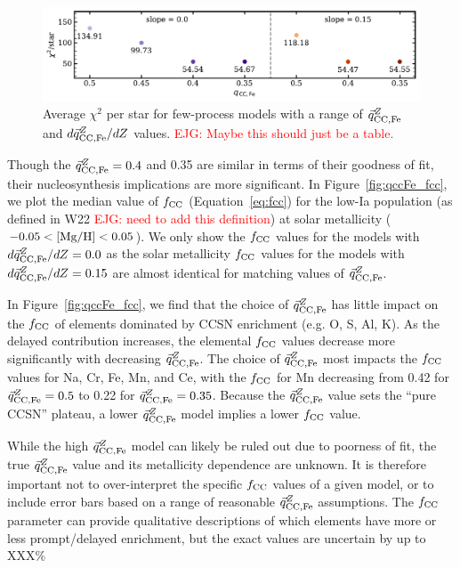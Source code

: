 \documentclass[modern]{aastex631}
\newcommand{\mgh}{[{\rm Mg}/{\rm H}]}
\newcommand{\qccFe}{\vec{q}_{{\rm CC, Fe}}^{Z}}
\newcommand{\dqccFe}{d\vec{q}_{{\rm CC, Fe}}^{Z}/dZ}
\newcommand{\fcc}{f_{\rm CC}}
\newcommand{\ejg}[1]{\textcolor{red}{EJG: #1}}
\begin{document}
\begin{figure}[htb!]
    \centering
    \includegraphics[width=\textwidth]{Paper/Figures/qccFe_chi2.pdf}
    \caption{Average $\chi^2$ per star for few-process models with a range of $\qccFe$ and $\dqccFe$ values. \ejg{Maybe this should just be a table.}}
    \label{fig:qccFe_chi2}
\end{figure}

Though the $\qccFe= 0.4$ and 0.35 are similar in terms of their goodness of fit, their nucleosynthesis implications are more significant. In Figure~\ref{fig:qccFe_fcc}, we plot the median value of $\fcc$ (Equation~\ref{eq:fcc}) for the low-Ia population (as defined in W22 \ejg{need to add this definition}) at solar metallicity ($-0.05 < \mgh < 0.05$). We only show the $\fcc$ values for the models with $\dqccFe=0.0$ as the solar metallicity $\fcc$ values for the models with $\dqccFe=0.15$ are almost identical for matching values of $\qccFe$.

In Figure~\ref{fig:qccFe_fcc}, we find that the choice of $\qccFe$ has little impact on the $\fcc$ of elements dominated by CCSN enrichment (e.g. O, S, Al, K). As the delayed contribution increases, the elemental $\fcc$ values decrease more significantly with decreasing $\qccFe$. The choice of $\qccFe$ most impacts the $\fcc$ values for Na, Cr, Fe, Mn, and Ce, with the $\fcc$ for Mn decreasing from 0.42 for $\qccFe=0.5$ to 0.22 for $\qccFe=0.35$. Because the $\qccFe$ value sets the ``pure CCSN'' plateau, a lower $\qccFe$ model implies a lower $\fcc$ value. 

While the high $\qccFe$ model can likely be ruled out due to poorness of fit, the true $\qccFe$ value and its metallicity dependence are unknown. It is therefore important not to over-interpret the specific $\fcc$ values of a given model, or to include error bars based on a range of reasonable $\qccFe$ assumptions. The $\fcc$ parameter can provide qualitative descriptions of which elements have more or less prompt/delayed enrichment, but the exact values are uncertain by up to XXX\%
\end{document}
